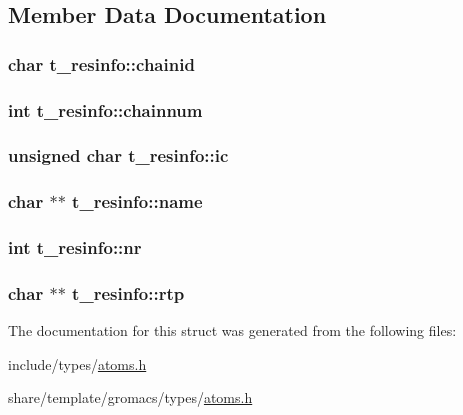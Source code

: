 \subsection{\-Member \-Data \-Documentation}
\hypertarget{structt__resinfo_a1e88abc1224a813649ccb93edcc0d68d}{
\subsubsection[{chainid}]{\setlength{\rightskip}{0pt plus 5cm}char {\bf t\-\_\-resinfo\-::chainid}}}\label{structt__resinfo_a1e88abc1224a813649ccb93edcc0d68d}
\hypertarget{structt__resinfo_aaedd414f71b7b89fa140bf0cab78904f}{
\subsubsection[{chainnum}]{\setlength{\rightskip}{0pt plus 5cm}int {\bf t\-\_\-resinfo\-::chainnum}}}\label{structt__resinfo_aaedd414f71b7b89fa140bf0cab78904f}
\hypertarget{structt__resinfo_a6436ea521e41c1f269436a4cecd39a4a}{
\subsubsection[{ic}]{\setlength{\rightskip}{0pt plus 5cm}unsigned char {\bf t\-\_\-resinfo\-::ic}}}\label{structt__resinfo_a6436ea521e41c1f269436a4cecd39a4a}
\hypertarget{structt__resinfo_ad0ab49ead9e77c50d5b672f947f7bf69}{
\subsubsection[{name}]{\setlength{\rightskip}{0pt plus 5cm}char $\ast$$\ast$ {\bf t\-\_\-resinfo\-::name}}}\label{structt__resinfo_ad0ab49ead9e77c50d5b672f947f7bf69}
\hypertarget{structt__resinfo_a743ca7c25ee0a21d0d1220be098e1286}{
\subsubsection[{nr}]{\setlength{\rightskip}{0pt plus 5cm}int {\bf t\-\_\-resinfo\-::nr}}}\label{structt__resinfo_a743ca7c25ee0a21d0d1220be098e1286}
\hypertarget{structt__resinfo_a8f3297455e8356f181bde1c566ff6685}{
\subsubsection[{rtp}]{\setlength{\rightskip}{0pt plus 5cm}char $\ast$$\ast$ {\bf t\-\_\-resinfo\-::rtp}}}\label{structt__resinfo_a8f3297455e8356f181bde1c566ff6685}


\-The documentation for this struct was generated from the following files\-:\begin{DoxyCompactItemize}
\item 
include/types/\hyperlink{include_2types_2atoms_8h}{atoms.\-h}\item 
share/template/gromacs/types/\hyperlink{share_2template_2gromacs_2types_2atoms_8h}{atoms.\-h}\end{DoxyCompactItemize}
